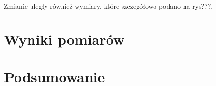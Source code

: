 



 Zmianie uległy również wymiary, które szczegółowo podano na rys???.
\chapter {Wyniki pomiarów}


\chapter {Podsumowanie}






